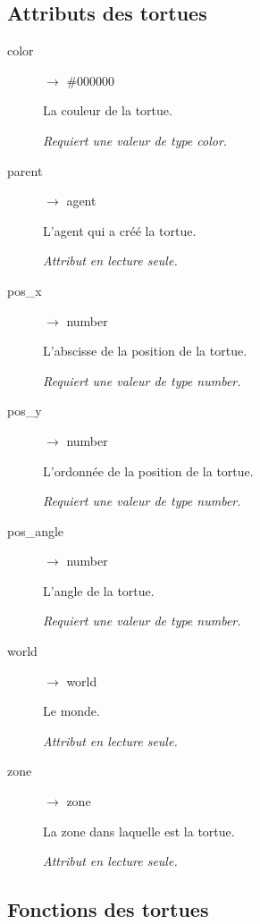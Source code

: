 \subsection{Attributs des tortues}

\begin{description}
	\item[color] $\rightarrow$ \#000000

	La couleur de la tortue.

	\emph{Requiert une valeur de type color.}

	\item[parent] $\rightarrow$ agent

	L'agent qui a créé la tortue.

	\emph{Attribut en lecture seule.}

	\item[pos\_x] $\rightarrow$ number

	L'abscisse de la position de la tortue.

	\emph{Requiert une valeur de type number.}

	\item[pos\_y] $\rightarrow$ number

	L'ordonnée de la position de la tortue.

	\emph{Requiert une valeur de type number.}

	\item[pos\_angle] $\rightarrow$ number

	L'angle de la tortue.

	\emph{Requiert une valeur de type number.}

	\item[world] $\rightarrow$ world

	Le monde.

	\emph{Attribut en lecture seule.}

	\item[zone] $\rightarrow$ zone

	La zone dans laquelle est la tortue.

	\emph{Attribut en lecture seule.}
\end{description}

\subsection{Fonctions des tortues}

